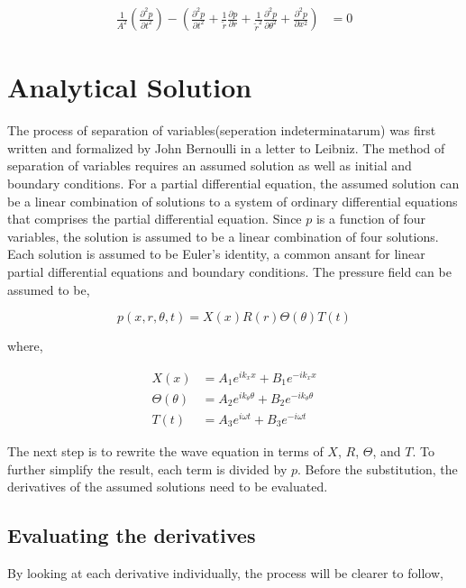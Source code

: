 \documentclass[a4paper]{article}
\begin{document}
\begin{align*} 
    \frac{1}{A^2}\left(
        \frac{\partial^2 {p}}{\partial t^2}
    \right) - 
        \left(
            \frac{\partial^2 {p}}{\partial t^2} + 
            \frac{1}{\tilde{r}}\frac{\partial p}{\partial r} +
            \frac{1}{\tilde{r}^2} \frac{\partial^2 p}{\partial \theta^2} + 
            \frac{\partial^2 p}{\partial x^2} 
        \right) &= 0  
\end{align*} 
\section{Analytical Solution}
The process of separation of variables(seperation indeterminatarum) was first written and formalized by John Bernoulli in a letter to Leibniz. The method
of separation of variables requires an assumed solution as well as initial and boundary 
conditions. For a partial differential equation, the assumed solution can be a 
linear combination of solutions to a system of ordinary differential equations that
comprises the partial differential equation. Since $p$ is a function of four
variables, the solution is assumed to be a linear combination of four solutions.
Each solution is assumed to be Euler's identity, a common ansant for linear partial 
differential equations and boundary conditions.  The pressure field can be assumed to be,

\begin{equation}
    p(x,r,\theta,t) = X(x) R(r) \Theta(\theta) T(t)
\end{equation}

where, 

\begin{align*}
    X(x) &=
    A_1 e^{ik_x x} +
    B_1 e^{-ik_x x }\\
    \Theta(\theta) &=
    A_2 e^{i k_{\theta} \theta } +
    B_2 e^{-ik_{\theta} \theta }\\
    T(t) &=
    A_3 e^{i \omega t } +
    B_3 e^{-i\omega t  }
\end{align*}

The next step is to rewrite the wave equation in terms of $X$, $R$, $\Theta$,
and $T$. To further simplify the result, each term is divided by $p$.
Before the substitution, the derivatives of the assumed solutions need to be
evaluated.

\subsection{Evaluating the derivatives}
By looking at each derivative individually, the process will be clearer to 
follow,
\end{document}
